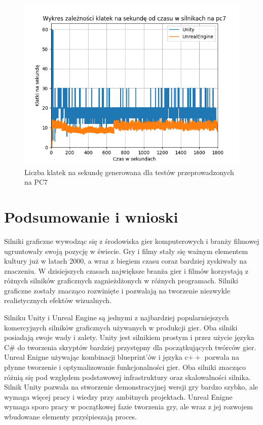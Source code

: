 \documentclass[12pt,twoside]{article}
\begin{document}
\begin{figure}[ht]
    \centering
    \includegraphics[width=16cm]{figures/FPSPlots/pc7searchedDataName.png}
    \caption{Liczba klatek na sekundę generowana dla testów przeprowadzonych na PC7}
    \label{Fig:PC7Tests}
\end{figure}    





\clearpage


\section{Podsumowanie i wnioski}

Silniki graficzne wywodząc się z środowiska gier komputerowych i branży filmowej
ugruntowały swoją pozycję w świecie. Gry i filmy stały się ważnym elementem
kultury już w latach 2000, a wraz z biegiem czasu coraz bardziej zyskiwały na
znaczeniu.  W dzisiejszych czasach największe branża gier i filmów korzystają z
różnych silników graficznych zagnieżdżonych w różnych programach. Silniki
graficzne zostały znacząco rozwinięte i pozwalają na tworzenie niezwykle
realistycznych efektów wizualnych.

Silniku Unity i Unreal Engine są jednymi z najbardziej popularniejszych
komercyjnych silników graficznych używanych w produkcji gier. Oba silniki
posiadają swoje wady i zalety. Unity jest silnikiem prostym i przez użycie
języka C\# do tworzenia skryptów bardziej przystępny dla początkujących twórców
gier. Unreal Enigne używając kombinacji blueprint’ów i języka c$++$ pozwala na
płynne tworzenie i optymalizowanie funkcjonalności gier. Oba silniki znacząco
różnią się pod względem podstawowej infrastruktury oraz skalowalności silnika.
Silnik Unity pozwala na stworzenie demonstracyjnej wersji gry bardzo szybko, ale
wymaga więcej pracy i wiedzy przy ambitnych projektach. Unreal Enigne wymaga
sporo pracy w początkowej fazie tworzenia gry, ale wraz z jej rozwojem wbudowane
elementy przyśpieszają proces. 
\end{document}
